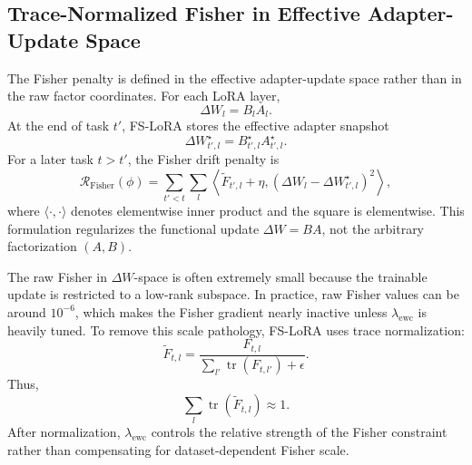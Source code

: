 \subsection{Trace-Normalized Fisher in Effective Adapter-Update Space}
\label{sec:trace_normalized_fisher}

The Fisher penalty is defined in the effective adapter-update space rather than in the raw factor coordinates.
For each LoRA layer,
\begin{equation}
\Delta W_l
=
B_lA_l.
\label{eq:delta_w}
\end{equation}
At the end of task $t'$, FS-LoRA stores the effective adapter snapshot
\begin{equation}
\Delta W_{t',l}^{\star}
=
B_{t',l}^{\star}A_{t',l}^{\star}.
\label{eq:delta_snapshot}
\end{equation}
For a later task $t>t'$, the Fisher drift penalty is
\begin{equation}
\mathcal R_{\mathrm{Fisher}}(\phi)
=
\sum_{t'<t}
\sum_l
\left\langle
\widetilde F_{t',l}+\eta,
\left(
\Delta W_l-\Delta W_{t',l}^{\star}
\right)^2
\right\rangle,
\label{eq:fisher_penalty}
\end{equation}
where $\langle\cdot,\cdot\rangle$ denotes elementwise inner product and the square is elementwise.
This formulation regularizes the functional update $\Delta W=BA$, not the arbitrary factorization $(A,B)$.

The raw Fisher in $\Delta W$-space is often extremely small because the trainable update is restricted to a low-rank subspace.
In practice, raw Fisher values can be around $10^{-6}$, which makes the Fisher gradient nearly inactive unless $\lambda_{\mathrm{ewc}}$ is heavily tuned.
To remove this scale pathology, FS-LoRA uses trace normalization:
\begin{equation}
\widetilde F_{t,l}
=
\frac{
F_{t,l}
}{
\sum_{l'}
\operatorname{tr}
\left(
F_{t,l'}
\right)
+
\epsilon
}.
\label{eq:trace_norm}
\end{equation}
Thus,
\begin{equation}
\sum_l
\operatorname{tr}
\left(
\widetilde F_{t,l}
\right)
\approx
1.
\label{eq:normalized_trace}
\end{equation}
After normalization, $\lambda_{\mathrm{ewc}}$ controls the relative strength of the Fisher constraint rather than compensating for dataset-dependent Fisher scale.

